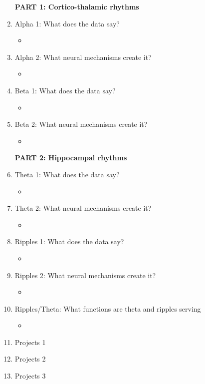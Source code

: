 \documentclass[11pt, reqno]{amsart}
\numberwithin{figure}{section}
\numberwithin{equation}{section}
\begin{document}
\begin{enumerate}
\textbf{PART 1: Cortico-thalamic rhythms}

\item Alpha 1: What does the data say?
\begin{itemize}
\item 
\end{itemize}
\item Alpha 2:  What neural mechanisms create it?
\begin{itemize}
\item 
\end{itemize}
\item Beta 1: What does the data say?
\begin{itemize}
\item 
\end{itemize}
\item Beta 2: What neural mechanisms create it?
\begin{itemize}
\item 
\end{itemize}

\textbf{PART 2: Hippocampal rhythms}

\item Theta 1: What does the data say?
\begin{itemize}
\item 
\end{itemize}
\item Theta 2: What neural mechanisms create it?
\begin{itemize}
\item 
\end{itemize}

\item Ripples 1: What does the data say?
\begin{itemize}
\item 
\end{itemize}
\item Ripples 2: What neural mechanisms create it?
\begin{itemize}
\item 
\end{itemize}

\item Ripples/Theta: What functions are theta and ripples serving
\begin{itemize}
\item 
\end{itemize}
\item Projects 1
\item Projects 2
\item Projects 3
\end{enumerate}
\end{document}
